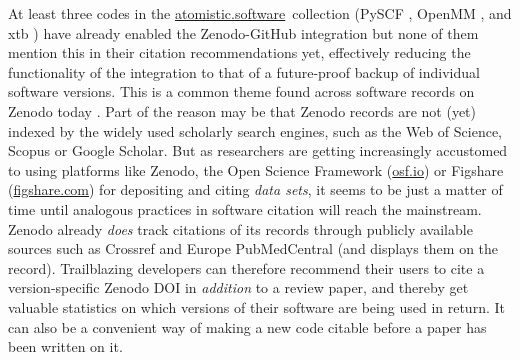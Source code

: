 \documentclass[9pt,review]{livecoms}
\newcommand{\atsoft}{\href{https://atomistic.software}{atomistic.software}\ }
\begin{document}

At least three codes in the \atsoft collection (PySCF \cite{Sun2020a,Sun2020b}, OpenMM \cite{Eastman2017,Eastman2020}, and xtb \cite{Bannwarth2021,Grimme2021}) have already enabled the Zenodo-GitHub integration but none of them mention this in their citation recommendations yet, effectively reducing the functionality of the integration to that of a future-proof backup of individual software versions.
This is a common theme found across software records on Zenodo today \cite{vandeSandt2019}.
Part of the reason may be that Zenodo records are not (yet) indexed by the widely used scholarly search engines, such as the Web of Science, Scopus or Google Scholar.
But as researchers are getting increasingly accustomed to using platforms like Zenodo, the Open Science Framework (\href{https://osf.io}{osf.io}) or Figshare (\href{https://figshare.com}{figshare.com}) for depositing and citing \emph{data sets}, it seems to be just a matter of time until analogous practices in software citation will reach the mainstream.
Zenodo already \emph{does} track citations of its records through publicly available sources such as Crossref and Europe PubMedCentral (and displays them on the record). 
Trailblazing developers can therefore recommend their users to cite a version-specific Zenodo DOI in \emph{addition} to a review paper, and thereby get valuable statistics on which versions of their software are being used in return.
It can also be a convenient way of making a new code citable before a paper has been written on it.
\end{document}
